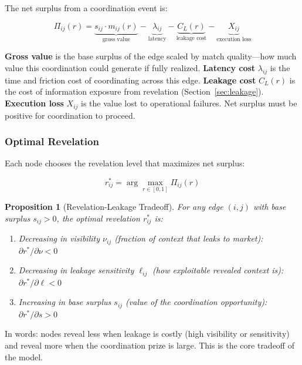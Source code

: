 \documentclass[12pt]{article}
\newtheorem{proposition}{Proposition}
\theoremstyle{definition}
\begin{document}
The net surplus from a coordination event is:

\begin{equation}
\label{eq:surplus}
\Pi_{ij}(r) = \underbrace{s_{ij} \cdot m_{ij}(r)}_{\text{gross value}} - \underbrace{\lambda_{ij}}_{\text{latency}} - \underbrace{C_L(r)}_{\text{leakage cost}} - \underbrace{X_{ij}}_{\text{execution loss}}
\end{equation}

\noindent \textbf{Gross value} is the base surplus of the edge scaled by match quality---how much value this coordination could generate if fully realized. \textbf{Latency cost} $\lambda_{ij}$ is the time and friction cost of coordinating across this edge. \textbf{Leakage cost} $C_L(r)$ is the cost of information exposure from revelation (Section~\ref{sec:leakage}). \textbf{Execution loss} $X_{ij}$ is the value lost to operational failures. Net surplus must be positive for coordination to proceed.

\subsubsection{Optimal Revelation}

Each node chooses the revelation level that maximizes net surplus:

\begin{equation}
\label{eq:optrev}
r^*_{ij} = \arg\max_{r \in [0,1]} \Pi_{ij}(r)
\end{equation}

\begin{proposition}[Revelation-Leakage Tradeoff]
\label{prop:tradeoff}
For any edge $(i,j)$ with base surplus $s_{ij} > 0$, the optimal revelation $r^*_{ij}$ is:
\begin{enumerate}
\item[(i)] Decreasing in visibility $\nu_{ij}$ (fraction of context that leaks to market): $\partial r^* / \partial \nu < 0$
\item[(ii)] Decreasing in leakage sensitivity $\ell_{ij}$ (how exploitable revealed context is): $\partial r^* / \partial \ell < 0$
\item[(iii)] Increasing in base surplus $s_{ij}$ (value of the coordination opportunity): $\partial r^* / \partial s > 0$
\end{enumerate}
\end{proposition}

\noindent In words: nodes reveal less when leakage is costly (high visibility or sensitivity) and reveal more when the coordination prize is large. This is the core tradeoff of the model.
\end{document}
